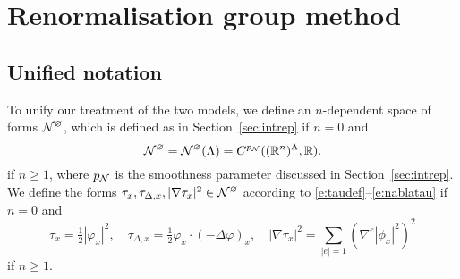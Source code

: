 \chapter{Renormalisation group method}




\section{Unified notation}

To unify our treatment of the two models, we define an $n$-dependent space of forms
$\mathcal{N}^\varnothing$, which is defined as in Section~\ref{sec:intrep} if $n = 0$ and
\begin{equation}
\label{e:Ncaldef}
\mathcal{N}^\varnothing
	= \mathcal{N}^\varnothing(\Lambda)
	= C^{p_{\mathcal{N}}}(({\mathbb R}^n)^\Lambda,{\mathbb R}).
\end{equation}
if $n \ge 1$, where $p_{\mathcal{N}}$ is the smoothness parameter discussed in Section~\ref{sec:intrep}.
We define the forms $\tau_x, \tau_{\Delta,x}, |\nabla\tau_x|^2 \in \mathcal{N}^\varnothing$ according
to \eqref{e:taudef}--\eqref{e:nablatau} if $n = 0$ and
\begin{equation}
\label{e:tauphi}
\tau_x = \tfrac{1}{2} |\varphi_x|^2,
	\quad
\tau_{\Delta,x} = \tfrac{1}{2} \varphi_x \cdot (-\Delta \varphi)_x,
	\quad
|\nabla\tau_x|^2 = \sum_{|e|=1} (\nabla^e |\phi_x|^2)^2
\end{equation}
if $n \ge 1$.

